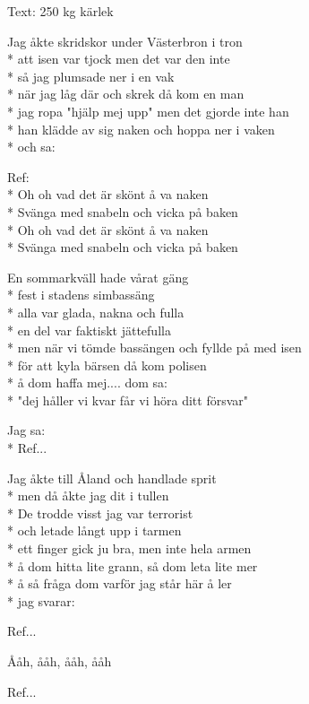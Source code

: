 \begin{SongText}[Naken]
\begin{SongInfo}
    Text: 250 kg kärlek
\end{SongInfo}
\begin{SongVerse}
Jag åkte skridskor under Västerbron i tron \\*%
att isen var tjock men det var den inte\\*%
så jag plumsade ner i en vak\\*%
när jag låg där och skrek då kom en man\\*%
jag ropa "hjälp mej upp" men det gjorde inte han\\*%
han klädde av sig naken och hoppa ner i vaken \\*%
och sa:
\end{SongVerse}
\begin{SongVerse}
Ref:\\*%
Oh oh vad det är skönt å va naken\\*%
Svänga med snabeln och vicka på baken\\*%
Oh oh vad det är skönt å va naken\\*%
Svänga med snabeln och vicka på baken
\end{SongVerse}
\begin{SongVerse}
En sommarkväll hade vårat gäng \\*%
fest i stadens simbassäng \\*%
alla var glada, nakna och fulla\\*%
en del var faktiskt jättefulla\\*%
men när vi tömde bassängen och fyllde på med isen \\*%
för att kyla bärsen då kom polisen\\*%
å dom haffa mej.... dom sa:\\*%
"dej håller vi kvar får vi höra ditt försvar"
\end{SongVerse}
\begin{SongVerse}
Jag sa:\\*%
Ref... 
\end{SongVerse}
\begin{SongVerse}
Jag åkte till Åland och handlade sprit \\*%
men då åkte jag dit i tullen\\*%
De trodde visst jag var terrorist \\*%
och letade långt upp i tarmen \\*%
ett finger gick ju bra, men inte hela armen\\*%
å dom hitta lite grann, så dom leta lite mer\\*%
å så fråga dom varför jag står här å ler\\*%
jag svarar:
\end{SongVerse}
\begin{SongVerse}
Ref...
\end{SongVerse}
\begin{SongVerse}
Ååh, ååh, ååh, ååh
\end{SongVerse}
\begin{SongVerse}
Ref... 
\end{SongVerse}
\end{SongText}
